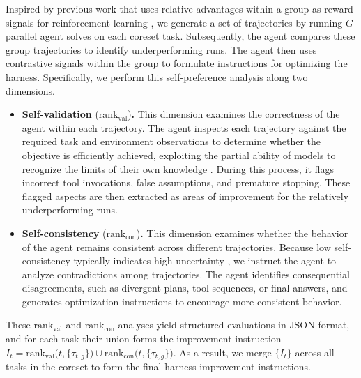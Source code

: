 Inspired by previous work that uses relative advantages within a group as reward signals for reinforcement learning \citep{shao2024deepseekmath}, we generate a set of trajectories by running $G$ parallel agent solves on each coreset task.
Subsequently, the agent compares these group trajectories to identify underperforming runs.
The agent then uses contrastive signals within the group to formulate instructions for optimizing the harness.
Specifically, we perform this self-preference analysis along two dimensions.
\begin{itemize}
    \item {} \textbf{Self-validation} ($\mathrm{rank}_{\mathrm{val}}$)\textbf{.} This dimension examines the correctness of the agent within each trajectory.
    The agent inspects each trajectory against the required task and environment observations to determine whether the objective is efficiently achieved, exploiting the partial ability of models to recognize the limits of their own knowledge \citep{pan2025refusal}.
    During this process, it flags incorrect tool invocations, false assumptions, and premature stopping. These flagged aspects are then extracted as areas of improvement for the relatively underperforming runs.
    \item {} \textbf{Self-consistency} ($\mathrm{rank}_{\mathrm{con}}$)\textbf{.} This dimension examines whether the behavior of the agent remains consistent across different trajectories.
    Because low self-consistency typically indicates high uncertainty \citep{wang2022selfconsistency,farquhar2024semantic}, we instruct the agent to analyze contradictions among trajectories.
    The agent identifies consequential disagreements, such as divergent plans, tool sequences, or final answers, and generates optimization instructions to encourage more consistent behavior.
\end{itemize}
These $\mathrm{rank}_{\mathrm{val}}$ and $\mathrm{rank}_{\mathrm{con}}$ analyses yield structured evaluations in JSON format, and for each task their union forms the improvement instruction $I_t = \mathrm{rank}_{\mathrm{val}}\bigl(t, \{\tau_{t,g}\}\bigr) \cup \mathrm{rank}_{\mathrm{con}}\bigl(t, \{\tau_{t,g}\}\bigr)$.
As a result, we merge $\{I_t\}$ across all tasks in the coreset to form the final harness improvement instructions.

